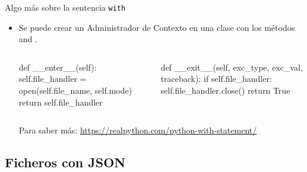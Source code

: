 \documentclass[10pt, envcountsect , spanish]{beamer}
\begin{document}
\begin{frame}[fragile]{Algo más sobre la sentencia {\tt with}}
\begin{itemize}
\begin{columns}
\end{columns}

\item Se puede crear un Administrador de Contexto en una clase con los métodos  and .

\tiny 
\begin{columns}

\begin{column}{.5\textwidth}

\begin{pyverbatim}[][frame=single, fontsize=\tiny]
def __enter__(self):
  self.file_handler = open(self.file_name, self.mode)
  return self.file_handler
\end{pyverbatim}

\end{column}


\begin{column}{.45\textwidth}

\begin{pyverbatim}[][frame=single, fontsize=\tiny]
def __exit__(self, exc_type, exc_val, traceback):
  if self.file_handler:
    self.file_handler.close()
  return True
\end{pyverbatim}

\end{column}

\end{columns}

\small 
Para saber más: \url{https://realpython.com/python-with-statement/}
\end{itemize}

\end{frame}





\subsection{Ficheros con JSON}
\end{document}
